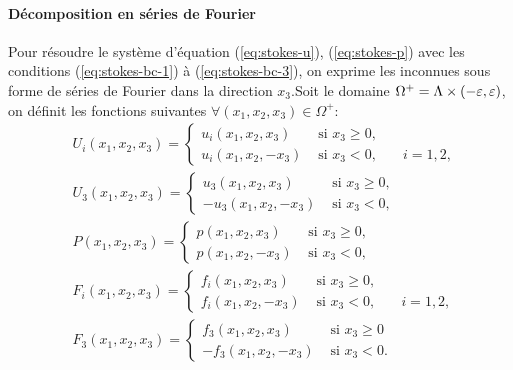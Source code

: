 \paragraph{Décomposition en séries de Fourier}
Pour résoudre le système d'équation (\ref{eq:stokes-u}),
(\ref{eq:stokes-p}) avec les conditions (\ref{eq:stokes-bc-1}) à
(\ref{eq:stokes-bc-3}), on exprime les inconnues sous forme de séries
de Fourier dans la direction $x_3$.Soit le domaine $\Omega^+ = \Lambda
\times (-\varepsilon, \varepsilon)$, on définit les fonctions suivantes
$\forall (x_1, x_2, x_3)\in \Omega^+$:
\begin{align}
  & U_i(x_1, x_2, x_3) = \left\{
    \begin{array}{lll}
      u_i(x_1, x_2, x_3) &\text{ si } x_3 \geq 0,\\
      u_i(x_1, x_2, -x_3) &\text{ si } x_3 < 0,     & \quad i = 1,2,
    \end{array}
  \right.\\
  & U_3(x_1, x_2, x_3) = \left\{
    \begin{array}{ll}
       u_3(x_1, x_2, x_3) &\text{ si } x_3 \geq 0,\\
      -u_3(x_1, x_2, -x_3) &\text{ si } x_3 < 0,
    \end{array}
  \right.\\
  & P(x_1, x_2, x_3) = \left\{
    \begin{array}{ll}
      p(x_1, x_2, x_3) &\text{ si } x_3 \geq 0,\\
      p(x_1, x_2, -x_3) &\text{ si } x_3 < 0,
    \end{array}
  \right.\\
  & F_i(x_1, x_2, x_3) = \left\{
    \begin{array}{lll}
      f_i(x_1, x_2, x_3) &\text{ si } x_3 \geq 0,\\
      f_i(x_1, x_2, -x_3) &\text{ si } x_3 < 0,     & \quad i = 1,2,
    \end{array}
  \right.\\
  & F_3(x_1, x_2, x_3) = \left\{
    \begin{array}{ll}
      f_3(x_1, x_2, x_3) &\text{ si } x_3 \geq 0\\
     -f_3(x_1, x_2, -x_3) &\text{ si } x_3 < 0.
    \end{array}
  \right.
\end{align}


